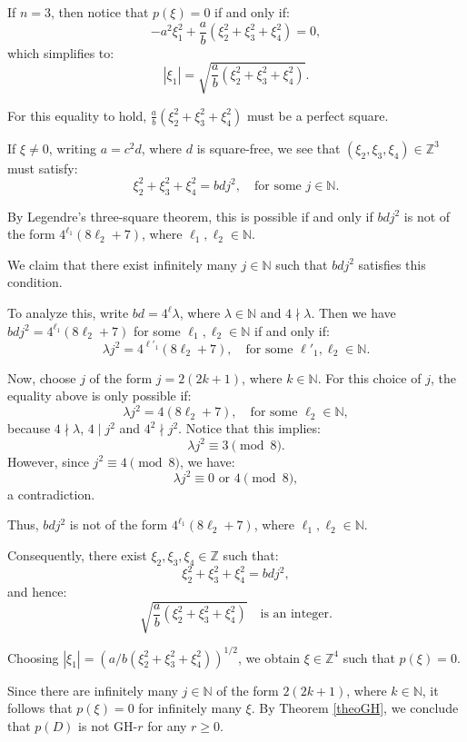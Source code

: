 \documentclass[11pt]{amsart}
\numberwithin{equation}{section}
\theoremstyle{definition}
\begin{document}
	\smallskip
	If $n = 3$, then notice that $p(\xi) = 0$ if and only if:
	\[
	-a^2 \xi_1^2 + \frac{a}{b} (\xi_2^2 + \xi_3^2 + \xi_4^2) = 0,
	\]
	which simplifies to:
	\[
	|\xi_1| = \sqrt{\frac{a}{b} (\xi_2^2 + \xi_3^2 + \xi_4^2)}.
	\]
	
	For this equality to hold, $\frac{a}{b} (\xi_2^2 + \xi_3^2 + \xi_4^2)$ must be a perfect square. 
	
 If $\xi\neq 0$, writing $a = c^2 d$, where $d$ is square-free, we see that $(\xi_2, \xi_3, \xi_4) \in \mathbb{Z}^3$ must satisfy:
	\[
	\xi_2^2 + \xi_3^2 + \xi_4^2 = b d j^2, \quad \text{for some } j \in \mathbb{N}.
	\]
		
	By Legendre's three-square theorem, this is possible if and only if $b d j^2$ is not of the form $4^{\ell_1} (8 \ell_2 + 7)$, where $\ell_1, \ell_2 \in \mathbb{N}$. 
	
	We claim that there exist infinitely many $j \in \mathbb{N}$ such that $b d j^2$ satisfies this condition.
	
	To analyze this, write $b d = 4^\ell \lambda$, where $\lambda \in \mathbb{N}$ and $4 \nmid \lambda$. Then we have $b d j^2 = 4^{\ell_1} (8 \ell_2 + 7)$ for some $\ell_1, \ell_2 \in \mathbb{N}$ if and only if:
	\[
	\lambda j^2 = 4^{\ell'_1} (8 \ell_2 + 7), \quad \text{for some } \ell'_1, \ell_2 \in \mathbb{N}.
	\]

	Now, choose $j$ of the form $j = 2(2k + 1)$, where $k \in \mathbb{N}$. For this choice of $j$, the equality above is only possible if:
	\[
	\lambda j^2 = 4 (8 \ell_2 + 7), \quad \text{for some } \ell_2 \in \mathbb{N},
	\]
	because $4 \nmid \lambda$, $4\mid j^2$ and $4^2 \nmid j^2$. Notice that this implies:
	\[
	\lambda j^2 \equiv 3 \pmod{8}.
	\]
	However, since $j^2 \equiv 4 \pmod{8}$, we have:
	\[
	\lambda j^2 \equiv 0 \text{ or } 4 \pmod{8},
	\]
	a contradiction. 
	
	Thus, $b d j^2$ is not of the form $4^{\ell_1} (8 \ell_2 + 7)$, where $\ell_1, \ell_2 \in \mathbb{N}$.
	
	Consequently, there exist $\xi_2, \xi_3, \xi_4 \in \mathbb{Z}$ such that:
	\[
	\xi_2^2 + \xi_3^2 + \xi_4^2 = b d j^2,
	\]
	and hence:
	\[
	\sqrt{\frac{a}{b} (\xi_2^2 + \xi_3^2 + \xi_4^2)} \quad \text{is an integer.}
	\]
	
	Choosing $|\xi_1| = ( a/b (\xi_2^2 + \xi_3^2 + \xi_4^2))^{1/2}$, we obtain $\xi \in \mathbb{Z}^4$ such that $p(\xi) = 0$. 
	
	Since there are infinitely many $j \in \mathbb{N}$ of the form $2(2k + 1)$, where $k \in \mathbb{N}$, it follows that $p(\xi) = 0$ for infinitely many $\xi$. By Theorem \ref{theoGH}, we conclude that $p(D)$ is not GH-$r$ for any $r \geq 0$.
\end{document}
